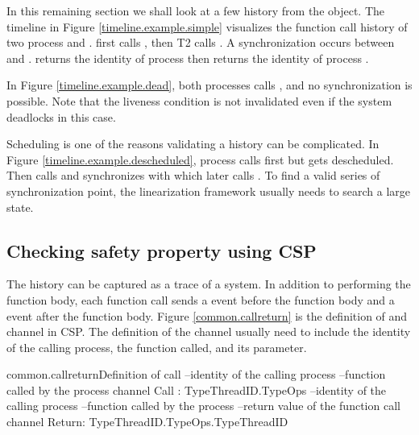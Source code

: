 \documentclass{article}
\begin{document}
In this remaining section we shall look at a few history from the  object. The timeline in Figure \ref{timeline.example.simple} visualizes the function call history of two process  and .  first calls , then T2 calls . A synchronization occurs between  and .  returns the identity of process  then  returns the identity of process .

In Figure \ref{timeline.example.dead}, both processes calls , and no synchronization is possible. Note that the liveness condition is not invalidated even if the system deadlocks in this case.

Scheduling is one of the reasons validating a history can be complicated. In Figure \ref{timeline.example.descheduled}, process  calls  first but gets descheduled. Then  calls  and synchronizes with  which later calls . To find a valid series of synchronization point, the linearization framework usually needs to search a large state. 

\subsection{Checking safety property using CSP} 
The history can be captured as a trace of a system. In addition to performing the function body, each function call sends a  event before the function body and a  event after the function body. Figure \ref{common.callreturn} is the definition of  and  channel in CSP. The definition of the channel usually need to include the identity of the calling process, the function called, and its parameter. 

\begin{cspinline}{common.callreturn}{Definition of call}
--identity of the calling process
--function called by the process
channel Call : TypeThreadID.TypeOps
--identity of the calling process
--function called by the process
--return value of the function call
channel Return: TypeThreadID.TypeOps.TypeThreadID
\end{cspinline}
\end{document}
